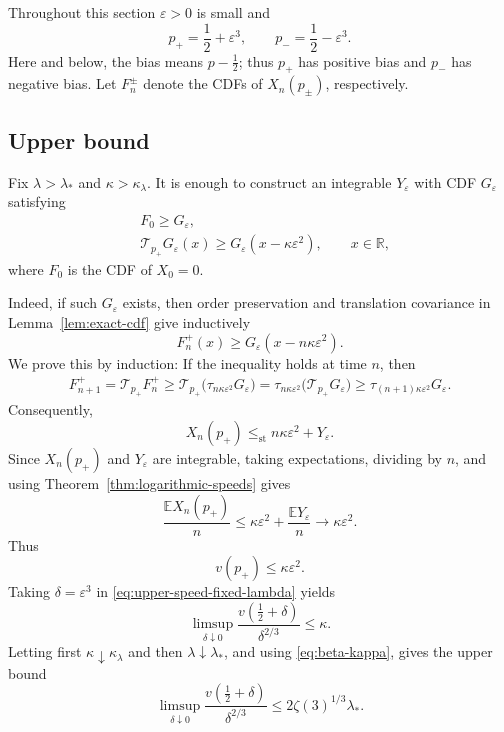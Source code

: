 \documentclass[a4paper,fleqn]{cas-sc}
\numberwithin{equation}{section}
\theoremstyle{plain}
\theoremstyle{definition}
\newcommand{\E}{\mathbb E}
\newcommand{\stle}{\le_{\mathrm{st}}}
\begin{document}
Throughout this section $\varepsilon>0$ is small and
\[
 p_+=\frac12+\varepsilon^3,
 \qquad
 p_-=\frac12-\varepsilon^3.
\]
Here and below, the bias means $p-\frac{1}{2}$; thus $p_+$ has positive
bias and $p_-$ has negative bias.  Let $F_n^\pm$ denote the CDFs of
$X_n(p_\pm)$, respectively.

\subsection{Upper bound}

Fix $\lambda>\lambda_*$ and $\kappa>\kappa_{\lambda}$.  It is enough to construct an
integrable $Y_\varepsilon$ with CDF $G_\varepsilon$ satisfying
\begin{align}
 &F_0\ge G_\varepsilon, \label{upp_barrier_init}\\
 &\mathcal T_{p_+}G_\varepsilon(x)
 \ge G_\varepsilon(x-\kappa\varepsilon^2),
 \qquad x\in\mathbb R,\label{upp_barrier_ineq}
\end{align}
where $F_0$ is the CDF of $X_0=0$.

Indeed, if such $G_\varepsilon$ exists, then order preservation and
translation covariance in Lemma~\ref{lem:exact-cdf} give inductively
\[
 F_n^+(x)\ge G_\varepsilon(x-n\kappa\varepsilon^2).
\]
We prove this by induction: If the inequality holds at time $n$, then
\[
\begin{aligned}
 F_{n+1}^+
 =\mathcal T_{p_+}F_n^+
 \ge \mathcal T_{p_+}
     \bigl(\tau_{n\kappa\varepsilon^2}G_\varepsilon\bigr)
 =\tau_{n\kappa\varepsilon^2}
     \bigl(\mathcal T_{p_+}G_\varepsilon\bigr)
 \ge\tau_{(n+1)\kappa\varepsilon^2}G_\varepsilon.
\end{aligned}
\]
Consequently,
\[
 X_n(p_+)\stle n\kappa\varepsilon^2+Y_\varepsilon.
\]
Since $X_n(p_+)$ and $Y_\varepsilon$ are integrable, taking expectations,
dividing by $n$, and using Theorem~\ref{thm:logarithmic-speeds} gives
\[
 \frac{\E X_n(p_+)}n
 \le \kappa\varepsilon^2+\frac{\E Y_\varepsilon}n
 \longrightarrow \kappa\varepsilon^2.
\]
Thus
\begin{equation}
 v(p_+)\le\kappa\varepsilon^2.
 \label{eq:upper-speed-fixed-lambda}
\end{equation}
Taking $\delta=\varepsilon^3$ in
\eqref{eq:upper-speed-fixed-lambda} yields
\[
 \limsup_{\delta\downarrow0}
 \frac{v(\frac12+\delta)}{\delta^{2/3}}
 \le\kappa.
\]
Letting first $\kappa\downarrow\kappa_{\lambda}$ and then
$\lambda\downarrow\lambda_*$, and using \eqref{eq:beta-kappa}, gives the upper bound
\begin{equation}
 \limsup_{\delta\downarrow0}
 \frac{v(\frac12+\delta)}{\delta^{2/3}}
 \le2\zeta(3)^{1/3}\lambda_*.
 \label{eq:sharp-upper-bound}
\end{equation}
\end{document}
